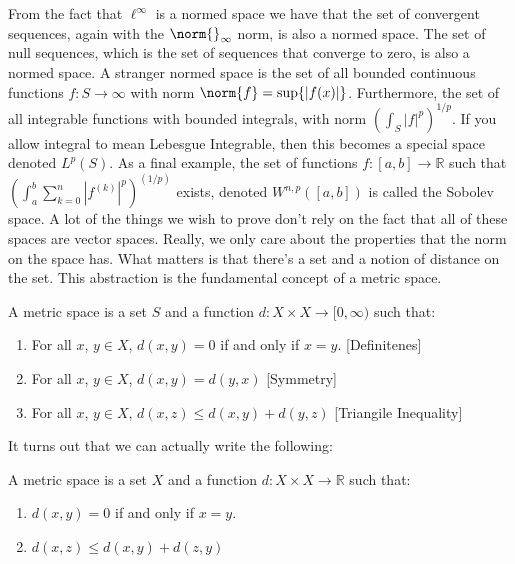 \documentclass[crop=false,class=book,oneside]{standalone}
\begin{document}
            From the fact that $\ell^{\infty}$ is a normed space
            we have that the set of convergent sequences,
            again with the $\norm{}_{\infty}$ norm, is also
            a normed space. The set of null sequences, which
            is the set of sequences that converge to zero,
            is also a normed space. A stranger normed space
            is the set of all bounded continuous functions
            $f:S\rightarrow\infty$ with norm
            $\norm{f}=\sup\{|f(x)|\}$. Furthermore, the
            set of all integrable functions with
            bounded integrals, with norm
            $(\int_{S}|f|^{p})^{1/p}$. If you allow integral
            to mean Lebesgue Integrable, then this becomes
            a special space denoted $L^{p}(S)$. As a final
            example, the set of functions
            $f:[a,b]\rightarrow\mathbb{R}$ such that
            $(\int_{a}^{b}\sum_{k=0}^{n}|f^{(k)}|^{p})^{(1/p)}$
            exists, denoted $W^{n,p}([a,b])$ is called
            the Sobolev space.
            A lot of the things we wish to
            prove don't rely on the fact that all of these
            spaces are vector spaces. Really, we only care about
            the properties that the norm on the space has.
            What matters is that there's a set and a notion
            of distance on the set. This abstraction is the
            fundamental concept of a metric space.
            \begin{definition}
                A metric space is a set $S$ and a function
                $d:{X}\times{X}\rightarrow[0,\infty)$ such that:
                \begin{enumerate}
                    \item For all $x$, $y\in{X}$, $d(x,y)=0$
                          if and only if $x=y$.
                          \hfill[Definitenes]
                    \item For all $x$, $y\in{X}$,
                          $d(x,y)=d(y,x)$
                          \hfill[Symmetry]
                    \item For all $x$, $y\in{X}$,
                          $d(x,z)\leq{d(x,y)+d(y,z)}$
                          \hfill[Triangile Inequality]
                \end{enumerate}
            \end{definition}
            It turns out
            that we can actually write the following:
            \begin{definition}
                A metric space is a set $X$ and a function
                $d:{X}\times{X}\rightarrow\mathbb{R}$
                such that:
                \begin{enumerate}
                    \item $d(x,y)=0$ if and only if
                          $x=y$.
                    \item $d(x,z)\leq{d(x,y)+d(z,y)}$
                \end{enumerate}
            \end{definition}
\end{document}
